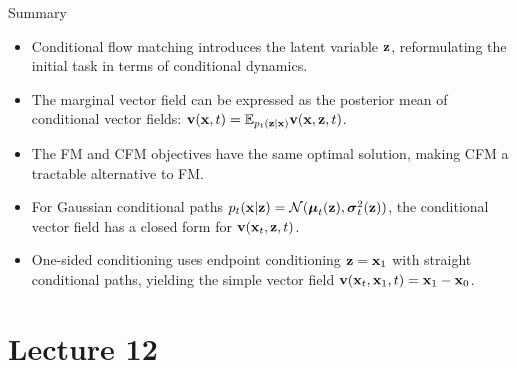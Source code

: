 \documentclass{beamer}
\begin{document}
\begin{frame}{Summary}
	\begin{itemize}
		\item Conditional flow matching introduces the latent variable $\mathbf{z}$, reformulating the initial task in terms of conditional dynamics.
		\vfill
		\item The marginal vector field can be expressed as the posterior mean of conditional vector fields: $\mathbf{v}(\mathbf{x}, t) = \mathbb{E}_{p_t(\mathbf{z} | \mathbf{x})} \mathbf{v}(\mathbf{x}, \mathbf{z}, t)$.
		\vfill
		\item The FM and CFM objectives have the same optimal solution, making CFM a tractable alternative to FM.
		\vfill
		\item For Gaussian conditional paths $p_t(\mathbf{x} | \mathbf{z}) = \mathcal{N}(\boldsymbol{\mu}_t(\mathbf{z}), \boldsymbol{\sigma}_t^2(\mathbf{z}))$, the conditional vector field has a closed form for $\mathbf{v}(\mathbf{x}_t, \mathbf{z}, t)$.
		\vfill
		\item One-sided conditioning uses endpoint conditioning $\mathbf{z} = \mathbf{x}_1$ with straight conditional paths, yielding the simple vector field $\mathbf{v}(\mathbf{x}_t, \mathbf{x}_1, t) = \mathbf{x}_1 - \mathbf{x}_0$.
	\end{itemize}
\end{frame}

\part{Lecture 12}

\begin{frame}
\titlepage
	\resetonslide
\end{frame}
\end{document}
